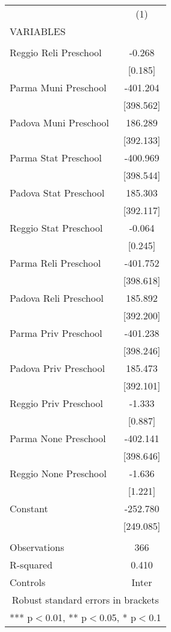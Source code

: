 \begin{tabular}{lc} \hline
 & (1) \\
VARIABLES &  \\ \hline
 &  \\
Reggio Reli Preschool & -0.268 \\
 & [0.185] \\
Parma Muni Preschool & -401.204 \\
 & [398.562] \\
Padova Muni Preschool & 186.289 \\
 & [392.133] \\
Parma Stat Preschool & -400.969 \\
 & [398.544] \\
Padova Stat Preschool & 185.303 \\
 & [392.117] \\
Reggio Stat Preschool & -0.064 \\
 & [0.245] \\
Parma Reli Preschool & -401.752 \\
 & [398.618] \\
Padova Reli Preschool & 185.892 \\
 & [392.200] \\
Parma Priv Preschool & -401.238 \\
 & [398.246] \\
Padova Priv Preschool & 185.473 \\
 & [392.101] \\
Reggio Priv Preschool & -1.333 \\
 & [0.887] \\
Parma None Preschool & -402.141 \\
 & [398.646] \\
Reggio None Preschool & -1.636 \\
 & [1.221] \\
Constant & -252.780 \\
 & [249.085] \\
 &  \\
Observations & 366 \\
R-squared & 0.410 \\
 Controls & Inter \\ \hline
\multicolumn{2}{c}{ Robust standard errors in brackets} \\
\multicolumn{2}{c}{ *** p$<$0.01, ** p$<$0.05, * p$<$0.1} \\
\end{tabular}
